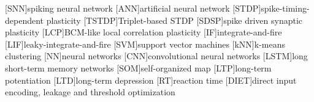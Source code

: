 \begin{acronym}[XXXX]
    [SNN]{spiking neural network}
    [ANN]{artificial neural network}
    [STDP]{spike-timing-dependent plasticity}
    [TSTDP]{Triplet-based STDP}
    [SDSP]{spike driven synaptic plasticity}
    [LCP]{BCM-like local correlation plasticity}
    [IF]{integrate-and-fire}
    [LIF]{leaky-integrate-and-fire}
    [SVM]{support vector machines}
    [kNN]{k-means clustering}
    [NN]{neural networks}
    [CNN]{convolutional neural networks}
    [LSTM]{long short-term memory networks}
    [SOM]{self-organized map}
    [LTP]{long-term potentiation}
    [LTD]{long-term depression}
    [RT]{reaction time}
    [DIET]{direct input encoding, leakage and threshold optimization}
\end{acronym}